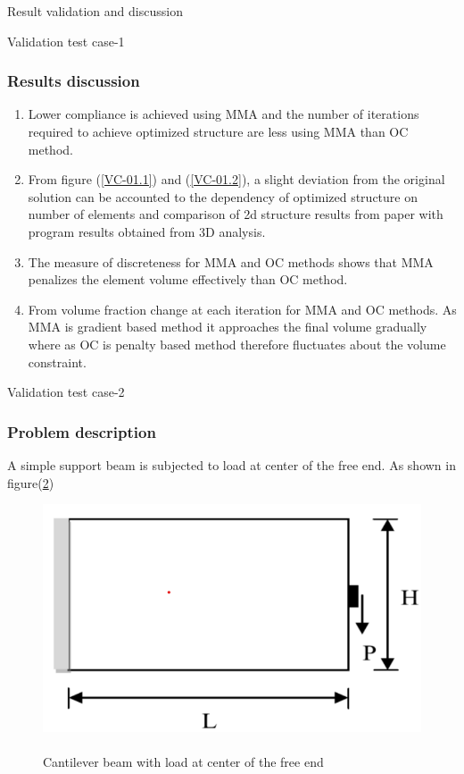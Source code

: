 \documentclass[a4paper,12pt,times]{article}
\begin{document}
\begin{section}{Result validation and discussion}
\begin{subsection}{Validation test case-1}
\begin{figure}[H]
\label{VC-02.4}
\end{figure}
\subsubsection{Results discussion}
\begin{enumerate}
\item Lower compliance is achieved using MMA and the number of iterations required to achieve optimized structure are less using MMA than OC method.

\item From figure (\ref{VC-01.1}) and (\ref{VC-01.2}), a slight deviation from the original solution can be accounted to the dependency of optimized structure on number of elements and comparison of 2d structure results from paper with program results obtained from 3D analysis.

\item The measure of discreteness for MMA and OC methods shows that MMA penalizes the element volume effectively than OC method.

\item From volume fraction change at each iteration for MMA and OC methods. As MMA is gradient based method it approaches the final volume gradually where as OC is penalty based method therefore fluctuates about the volume constraint.
\end{enumerate}

\end{subsection}


\begin{subsection}{Validation test case-2}
\subsubsection{Problem description}
A simple support beam is subjected to load at center of the free end. As shown in figure(\ref{fig:problem-2})
\begin{figure}[H]
	\begin{center}
		\includegraphics[scale=0.5]{Problem-2.png} 
		\caption{\\Cantilever beam with load at center of the free end}\label{fig:problem-2}
	\end{center}	
\end{figure}


\end{subsection}
\end{section}
\end{document}
